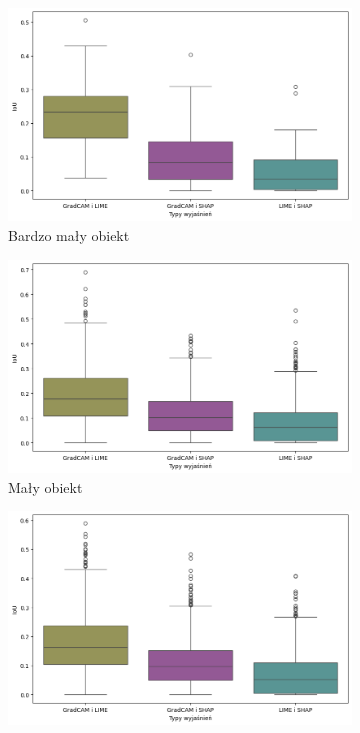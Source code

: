 \begin{figure}[h]
	\centering
	\begin{subfigure}[b]{0.3\textwidth}
		\includegraphics[width=1\textwidth]{img/base_coherence_size_XS}
		\caption{Bardzo mały obiekt}  \label{}
	\end{subfigure}
	\begin{subfigure}[b]{0.3\textwidth}
		\includegraphics[width=1\textwidth]{img/base_coherence_size_S}
		\caption{Mały obiekt}  \label{}
	\end{subfigure}
	\begin{subfigure}[b]{0.3\textwidth}
		\centering\includegraphics[width=1\textwidth]{img/base_coherence_size_M}

\end{subfigure}
\end{figure}
